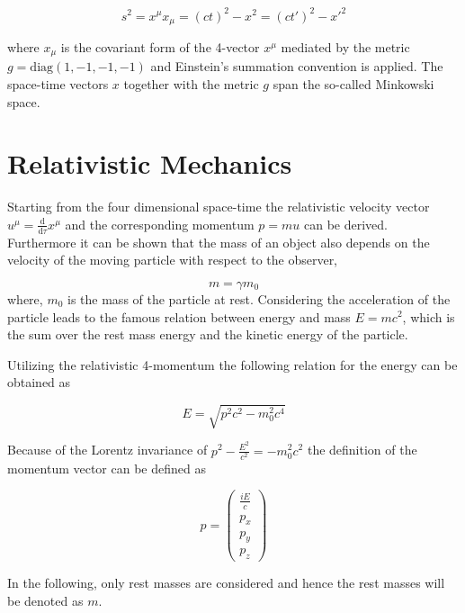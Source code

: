\begin{equation}\label{linvarianz}
 s^2 = x^\mu x_\mu =  \left(ct\right)^2 - x^2 = \left(ct'\right)^2 - x'^2 
\end{equation}

where $x_\mu$ is the covariant form of the 4-vector $x^\mu$ mediated by the
metric  $g= \mathrm{diag}(1,-1,-1,-1)$ and Einstein's summation convention is
applied.
The space-time vectors $x$ together with the metric $g$ span the so-called
Minkowski space.



\section{Relativistic Mechanics}
Starting from the four dimensional space-time the relativistic velocity vector
$u^\mu = \frac{\mathrm{d}}{\mathrm{d}\tau} x^\mu$
and the corresponding momentum $p=mu$ can be derived.
Furthermore it can be shown that the mass of an object also depends on the
velocity of the moving particle with respect to the observer,

\begin{equation}\label{relmasse}
m = \gamma m_0
\end{equation}
where, $m_0$ is the
mass of the particle at rest.
Considering the acceleration of the particle leads to the famous relation between
energy and mass $E=mc^2$, which is the sum over the rest mass energy and the
kinetic energy of the particle.

Utilizing the relativistic 4-momentum the following relation for the energy
can be obtained as

\begin{equation}\label{relE}
E = \sqrt{p^2c^2 - m_0^2c^4}
\end{equation}

Because of the Lorentz invariance of $p^2 -\frac{E^2}{c^2} = -m_0^2c^2$
the definition of the momentum vector can be defined as

\begin{equation}\label{viererp}
{p} = \begin{pmatrix}\frac{iE}{c}\\p_x\\p_y\\p_z
\end{pmatrix}
\end{equation}

In the following, only rest masses are considered and hence the rest masses
will be denoted as $m$.


